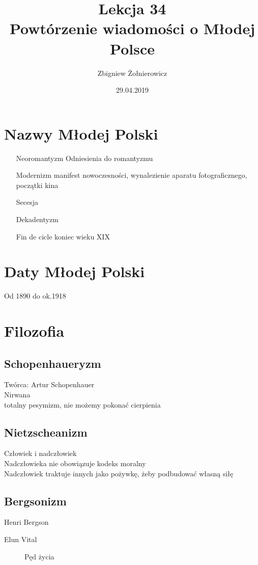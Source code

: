 \documentclass[a4paper]{article}
\begin{document}
\title{
        {\huge Lekcja 34} \\
        {\large Powtórzenie wiadomości o Młodej Polsce}
}
\author{Zbigniew Żołnierowicz}
\date{29.04.2019}
\maketitle
\section{Nazwy Młodej Polski}
\begin{itemize}
    \item[Neoromantyzm] Odniesienia do romantyzmu
    \item[Modernizm] manifest nowoczesności, wynalezienie aparatu fotograficznego, początki kina
    \item[Secesja] 
    \item[Dekadentyzm] 
    \item[Fin de cicle] koniec wieku XIX
\end{itemize}
\section{Daty Młodej Polski}
Od 1890 do ok.\@ 1918
\section{Filozofia}
\subsection{Schopenhaueryzm}
Twórca: Artur Schopenhauer \\
Nirwana \\
totalny pesymizm, nie możemy pokonać cierpienia
\subsection{Nietzscheanizm}
Człowiek i nadczłowiek \\
Nadczłowieka nie obowiązuje kodeks moralny \\
Nadczłowiek traktuje innych jako pożywkę, żeby podbudować własną siłę
\subsection{Bergsonizm}
Henri Bergson

\begin{description}
    \item[Elun Vital] Pęd życia
\end{description}
\end{document}
